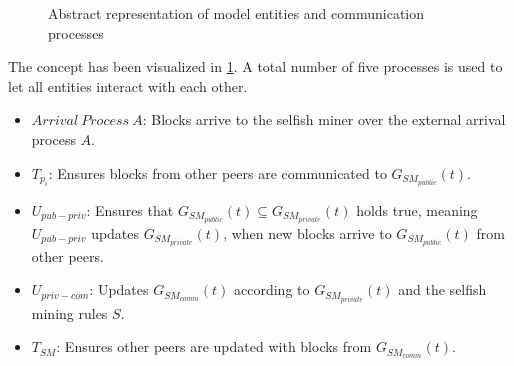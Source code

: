 \begin{figure}
\begin{center}
\end{center}
   \caption{Abstract representation of model entities and communication processes}
\label{fig:model_vis}

\end{figure}
The concept has been visualized in \ref{fig:model_vis}.
A total number of five processes is used to let all entities interact with each other.
\begin{itemize}
\item $Arrival~Process~A$: Blocks arrive to the selfish miner over the external arrival process $A$.

\item $T_{p_i}$: Ensures blocks from other peers are communicated to $G_{SM_{public}}(t)$.
\item $U_{pub-priv}$: Ensures that $G_{SM_{public}}(t)\subseteq G_{SM_{private}}(t)$ holds true, meaning $U_{pub-priv}$ updates $G_{SM_{private}}(t)$, when new blocks arrive to $G_{SM_{public}}(t)$ from other peers.
\item $U_{priv-com}$: Updates $G_{SM_{comm}}(t)$ according to $G_{SM_{private}}(t)$ and the selfish mining rules $S$.

\item $T_{SM}$: Ensures other peers are updated with blocks from $G_{SM_{comm}}(t)$.

\end{itemize}

